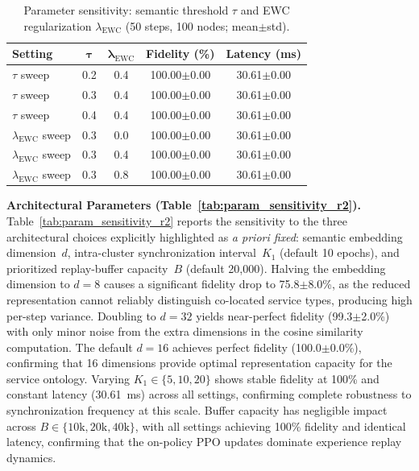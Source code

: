 \documentclass[conference]{IEEEtran}
\begin{document}
	\begin{table}[t]
	\centering
	\caption{Parameter sensitivity: semantic threshold $\tau$ and EWC regularization $\lambda_{\mathrm{EWC}}$ (50 steps, 100 nodes; mean$\pm$std).}
	\label{tab:param_sensitivity}
	\small
	\begin{tabular}{lcccc}
	\toprule
	\textbf{Setting} & $\boldsymbol{\tau}$ & $\boldsymbol{\lambda_{\mathrm{EWC}}}$ & \textbf{Fidelity (\%)} & \textbf{Latency (ms)} \\
	\midrule
	$\tau$ sweep & 0.2 & 0.4 & 100.00$\pm$0.00 & 30.61$\pm$0.00 \\
	$\tau$ sweep & 0.3 & 0.4 & 100.00$\pm$0.00 & 30.61$\pm$0.00 \\
	$\tau$ sweep & 0.4 & 0.4 & 100.00$\pm$0.00 & 30.61$\pm$0.00 \\
	\midrule
	$\lambda_{\mathrm{EWC}}$ sweep & 0.3 & 0.0 & 100.00$\pm$0.00 & 30.61$\pm$0.00 \\
	$\lambda_{\mathrm{EWC}}$ sweep & 0.3 & 0.4 & 100.00$\pm$0.00 & 30.61$\pm$0.00 \\
	$\lambda_{\mathrm{EWC}}$ sweep & 0.3 & 0.8 & 100.00$\pm$0.00 & 30.61$\pm$0.00 \\
	\bottomrule
	\end{tabular}
	\end{table}

	\textcolor{revblue}{\textbf{Architectural Parameters (Table~\ref{tab:param_sensitivity_r2}).}}
	\textcolor{revblue}{Table~\ref{tab:param_sensitivity_r2} reports the sensitivity to the three architectural choices explicitly highlighted as \emph{a priori fixed}: semantic embedding dimension~$d$, intra-cluster synchronization interval~$K_1$ (default 10 epochs), and prioritized replay-buffer capacity~$B$ (default 20{,}000). Halving the embedding dimension to $d{=}8$ causes a significant fidelity drop to 75.8$\pm$8.0\%, as the reduced representation cannot reliably distinguish co-located service types, producing high per-step variance. Doubling to $d{=}32$ yields near-perfect fidelity (99.3$\pm$2.0\%) with only minor noise from the extra dimensions in the cosine similarity computation. The default $d{=}16$ achieves perfect fidelity (100.0$\pm$0.0\%), confirming that 16 dimensions provide optimal}
	\textcolor{revblue}{representation capacity for the service ontology.}
	\textcolor{revblue}{Varying $K_1 \in \{5, 10, 20\}$ shows stable fidelity at 100\% and constant latency (30.61~ms) across all settings, confirming complete robustness to synchronization frequency at this scale.}
	\textcolor{revblue}{Buffer capacity has negligible impact across $B \in \{10\text{k}, 20\text{k}, 40\text{k}\}$, with all settings achieving 100\% fidelity and identical latency, confirming that the on-policy PPO updates dominate experience replay dynamics.}
\end{document}
